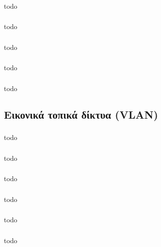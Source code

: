 \documentclass[a4paper, 12pt]{article}
\begin{document}
		\subsubsection{}
			todo

		\subsubsection{}
			todo

		\subsubsection{}
			todo

		\subsubsection{}
			todo

		\subsubsection{}
			todo

	\subsection{Εικονικά τοπικά δίκτυα (VLAN)}

		\subsubsection{}
			todo

		\subsubsection{}
			todo

		\subsubsection{}
			todo

		\subsubsection{}
			todo

		\subsubsection{}
			todo

		\subsubsection{}
			todo
\end{document}
